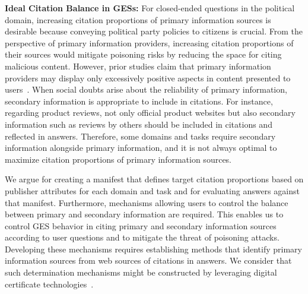 \textbf{Ideal Citation Balance in GESs:}
For closed-ended questions in the political domain, increasing citation proportions of primary information sources is desirable because conveying political party policies to citizens is crucial.
From the perspective of primary information providers, increasing citation proportions of their sources would mitigate poisoning risks by reducing the space for citing malicious content.
However, prior studies claim that primary information providers may display only excessively positive aspects in content presented to users~\cite{kluver2016setting,leung2015impression,chen2024impression}.
When social doubts arise about the reliability of primary information, secondary information is appropriate to include in citations.
For instance, regarding product reviews, not only official product websites but also secondary information such as reviews by others should be included in citations and reflected in answers.
Therefore, some domains and tasks require secondary information alongside primary information, and it is not always optimal to maximize citation proportions of primary information sources.

We argue for creating a manifest that defines target citation proportions based on publisher attributes for each domain and task and for evaluating answers against that manifest.
Furthermore, mechanisms allowing users to control the balance between primary and secondary information are required.
This enables us to control GES behavior in citing primary and secondary information sources according to user questions and to mitigate the threat of poisoning attacks.
Developing these mechanisms requires establishing methods that identify primary information sources from web sources of citations in answers.
We consider that such determination mechanisms might be constructed by leveraging digital certificate technologies~\cite{w3c-vc-data-model-2025,originator-profile-2025,c2pa-org}.


